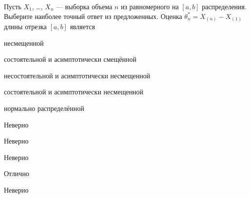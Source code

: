 
\begin{question}
Пусть \(X_1\), \ldots, \(X_n\) — выборка объема \(n\) из равномерного
на \([a, b]\) распределения. Выберите наиболее точный ответ из
предложенных. Оценка \(\theta^*_n = X_{(n)}-X_{(1)}\) длины отрезка
\([a,b]\) является
\begin{answerlist}
  \item несмещенной
  \item состоятельной и асимптотически смещённой
  \item несостоятельной и асимптотически несмещенной
  \item состоятельной и асимптотически несмещенной
  \item нормально распределённой
\end{answerlist}
\end{question}

\begin{solution}
\begin{answerlist}
  \item Неверно
  \item Неверно
  \item Неверно
  \item Отлично
  \item Неверно
\end{answerlist}
\end{solution}

